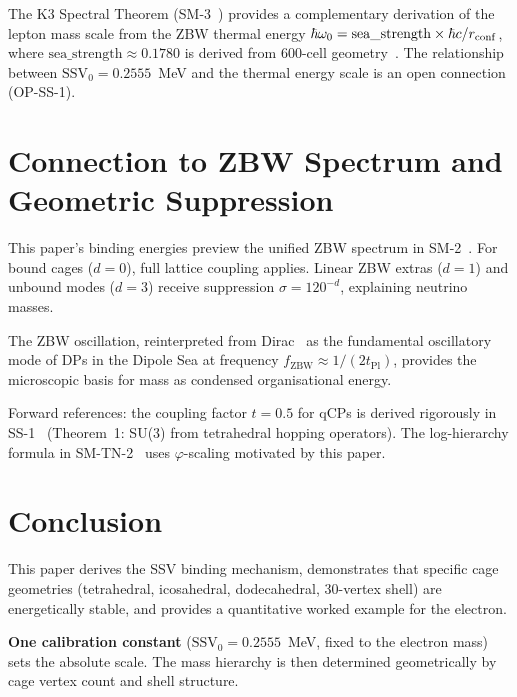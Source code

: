 \documentclass[11pt]{article}
\begin{document}
The K3 Spectral Theorem (SM-3~\cite{abshier_paper3}) provides a
complementary derivation of the lepton mass scale from the ZBW thermal
energy $\hbar\omega_0 = \text{sea\_strength} \times \hbar c / r_{\rm conf}$,
where $\text{sea\_strength} \approx 0.1780$ is derived from 600-cell
geometry~\cite{abshier_ss}.  The relationship between
$\text{SSV}_0 = 0.2555$~MeV and the thermal energy scale is an open
connection (OP-SS-1).

\section{Connection to ZBW Spectrum and Geometric Suppression}

This paper's binding energies preview the unified ZBW spectrum in
SM-2~\cite{abshier_sm2}.  For bound cages ($d=0$), full lattice coupling
applies.  Linear ZBW extras ($d=1$) and unbound modes ($d=3$) receive
suppression $\sigma = 120^{-d}$, explaining neutrino masses.

The ZBW oscillation, reinterpreted from Dirac~\cite{dirac1928} as the
fundamental oscillatory mode of DPs in the Dipole Sea at frequency
$f_{\text{ZBW}} \approx 1/(2 t_{\text{Pl}})$, provides the microscopic
basis for mass as condensed organisational energy.

Forward references: the coupling factor $t = 0.5$ for qCPs is derived
rigorously in SS-1~\cite{abshier_ss} (Theorem~1: SU(3) from tetrahedral
hopping operators).  The log-hierarchy formula in SM-TN-2~\cite{abshier_tn2}
uses $\varphi$-scaling motivated by this paper.

\section{Conclusion}

This paper derives the SSV binding mechanism, demonstrates that specific
cage geometries (tetrahedral, icosahedral, dodecahedral, 30-vertex shell)
are energetically stable, and provides a quantitative worked example for
the electron.

\textbf{One calibration constant} ($\text{SSV}_0 = 0.2555$~MeV, fixed to
the electron mass) sets the absolute scale.  The mass hierarchy is then
determined geometrically by cage vertex count and shell structure.
\end{document}
